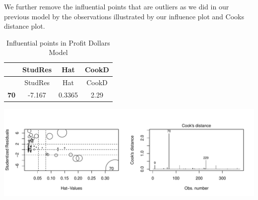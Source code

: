 \documentclass[]{elsarticle} %
\makeatletter
\def\maxwidth{\ifdim\Gin@nat@width>\linewidth\linewidth
\else\Gin@nat@width\fi}
\let\Oldincludegraphics\includegraphics
\renewcommand{\includegraphics}[1]{\Oldincludegraphics[width=\maxwidth]{#1}}
\makeatother
\begin{document}
We further remove the influential points that are outliers as we did in
our previous model by the observations illustrated by our influence plot
and Cooks distance plot.

\begin{longtable}[]{@{}cccc@{}}
\caption{Influential points in Profit Dollars Model}\tabularnewline
\toprule
\begin{minipage}[b]{0.11\columnwidth}\centering\strut
~\strut
\end{minipage} & \begin{minipage}[b]{0.12\columnwidth}\centering\strut
StudRes\strut
\end{minipage} & \begin{minipage}[b]{0.09\columnwidth}\centering\strut
Hat\strut
\end{minipage} & \begin{minipage}[b]{0.09\columnwidth}\centering\strut
CookD\strut
\end{minipage}\tabularnewline
\midrule
\endfirsthead
\toprule
\begin{minipage}[b]{0.11\columnwidth}\centering\strut
~\strut
\end{minipage} & \begin{minipage}[b]{0.12\columnwidth}\centering\strut
StudRes\strut
\end{minipage} & \begin{minipage}[b]{0.09\columnwidth}\centering\strut
Hat\strut
\end{minipage} & \begin{minipage}[b]{0.09\columnwidth}\centering\strut
CookD\strut
\end{minipage}\tabularnewline
\midrule
\endhead
\begin{minipage}[t]{0.11\columnwidth}\centering\strut
\textbf{70}\strut
\end{minipage} & \begin{minipage}[t]{0.12\columnwidth}\centering\strut
-7.167\strut
\end{minipage} & \begin{minipage}[t]{0.09\columnwidth}\centering\strut
0.3365\strut
\end{minipage} & \begin{minipage}[t]{0.09\columnwidth}\centering\strut
2.29\strut
\end{minipage}\tabularnewline
\bottomrule
\end{longtable}

\includegraphics{Final_Project_files/figure-latex/unnamed-chunk-18-1.pdf}
\end{document}
